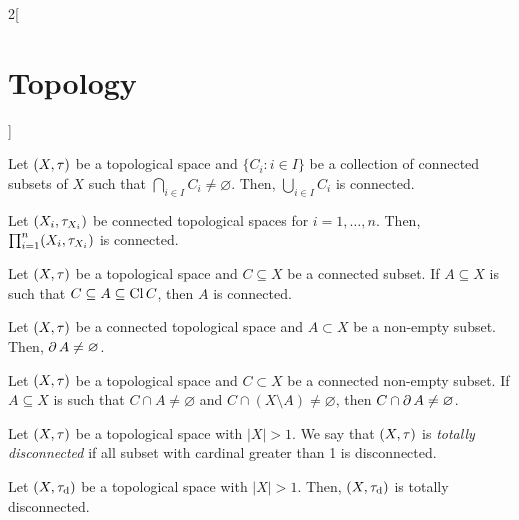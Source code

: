 \documentclass[../../../main.tex]{subfiles}
\begin{document}
\begin{multicols}{2}[\section{Topology}]
\begin{lemma}
  \end{lemma}
  \begin{prop}
    Let $(X,\tau)$ be a topological space and $\{C_i:i\in I\}$ be a collection of connected subsets of $X$ such that $\bigcap_{i\in I} C_i\ne\varnothing$. Then, $\bigcup_{i\in I} C_i$ is connected.
  \end{prop}
  \begin{theorem}
    Let $(X_i,\tau_{X_i})$ be connected topological spaces for $i=1,\ldots,n$. Then, $\prod_{i=1}^n(X_i,\tau_{X_i})$ is connected.
  \end{theorem}
  \begin{theorem}
    Let $(X,\tau)$ be a topological space and $C\subseteq X$ be a connected subset. If $A\subseteq X$ is such that $C\subseteq A\subseteq \operatorname{Cl} C$, then $A$ is connected.
  \end{theorem}
  \begin{prop}
    Let $(X,\tau)$ be a connected topological space and $A\subset X$ be a non-empty subset. Then, $\operatorname{\partial} A\ne\varnothing$.
  \end{prop}
  \begin{prop}
    Let $(X,\tau)$ be a topological space and $C\subset X$ be a connected non-empty subset. If $A\subseteq X$ is such that $C\cap A\ne\varnothing$ and $C\cap(X\setminus A)\ne\varnothing$, then $C\cap\operatorname{\partial} A\ne\varnothing$.
  \end{prop}
  \begin{definition}
    Let $(X,\tau)$ be a topological space with $|X|>1$. We say that $(X,\tau)$ is \emph{totally disconnected} if all subset with cardinal greater than 1 is disconnected.
  \end{definition}
  \begin{prop}
    Let $(X,\tau_\text{d})$ be a topological space with $|X|>1$. Then, $(X,\tau_\text{d})$ is totally disconnected.
  \end{prop}

\end{multicols}
\end{document}
